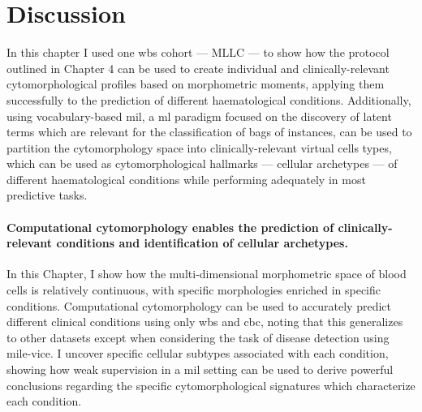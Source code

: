\FloatBarrier

\section{Discussion}

In this chapter I used one \ac{wbs} cohort --- MLLC --- to show how the protocol outlined in Chapter 4 can be used to create individual and clinically-relevant cytomorphological profiles based on morphometric moments, applying them successfully to the prediction of different haematological conditions. Additionally, using vocabulary-based \ac{mil}, a \ac{ml} paradigm focused on the discovery of latent terms which are relevant for the classification of bags of instances, can be used to partition the cytomorphology space into clinically-relevant virtual cells types, which can be used as cytomorphological hallmarks --- cellular archetypes --- of different haematological conditions while performing adequately in most predictive tasks.

\paragraph{Computational cytomorphology enables the prediction of clinically-relevant conditions and identification of cellular archetypes.} In this Chapter, I show how the multi-dimensional morphometric space of blood cells is relatively continuous, with specific morphologies enriched in specific conditions. Computational cytomorphology can be used to accurately predict different clinical conditions using only \ac{wbs} and \ac{cbc}, noting that this generalizes to other datasets except when considering the task of disease detection using \ac{mile-vice}. I uncover specific cellular subtypes associated with each condition, showing how weak supervision in a \ac{mil} setting can be used to derive powerful conclusions regarding the specific cytomorphological signatures which characterize each condition. 

